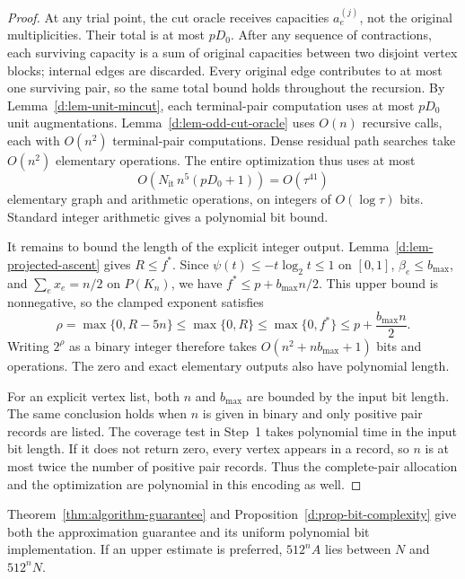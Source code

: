 \begin{proof}
At any trial point, the cut oracle receives capacities \(a_e^{(j)}\),
not the original multiplicities.  Their total is at most \(pD_0\).
After any sequence of contractions, each surviving capacity is a sum
of original capacities between two disjoint vertex blocks; internal
edges are discarded.  Every original edge contributes to at most one
surviving pair, so the same total bound holds throughout the recursion.
By Lemma~\ref{d:lem-unit-mincut}, each terminal-pair computation uses at
most \(pD_0\) unit augmentations.  Lemma~\ref{d:lem-odd-cut-oracle} uses
\(O(n)\) recursive calls, each with \(O(n^2)\) terminal-pair
computations.  Dense residual path searches take \(O(n^2)\) elementary
operations.  The entire optimization thus uses at most
\[
            O\!\left(N_{\mathrm{it}}\,n^5(pD_0+1)\right)
                         =O(\tau^{41})
\]
elementary graph and arithmetic operations, on integers of
\(O(\log\tau)\) bits.  Standard integer arithmetic gives a polynomial
bit bound.

It remains to bound the length of the explicit integer output.
Lemma~\ref{d:lem-projected-ascent} gives \(R\le f^*\).
Since \(\psi(t)\le -t\log_2t\le1\) on \([0,1]\),
\(\beta_e\le b_{\max}\), and \(\sum_e x_e=n/2\) on \(P(K_n)\),
we have \(f^*\le p+b_{\max}n/2\).  This upper bound is nonnegative, so the
clamped exponent satisfies
\begin{equation}
\label{d:eq-clamped-output-size}
 \rho=\max\{0,R-5n\}
       \le\max\{0,R\}
       \le\max\{0,f^*\}
       \le p+\frac{b_{\max}n}{2}.
\end{equation}
Writing \(2^\rho\) as a binary integer therefore takes
\(O(n^2+nb_{\max}+1)\) bits and operations.  The zero and exact elementary
outputs also have polynomial length.

For an explicit vertex list, both \(n\) and \(b_{\max}\) are bounded by the
input bit length.  The same conclusion holds when \(n\) is given in
binary and only positive pair records are listed. The coverage test in
Step~1 takes polynomial time in the input bit length. If it does not
return zero, every vertex appears in a record, so \(n\) is at most twice
the number of positive pair records. Thus the complete-pair allocation
and the optimization are polynomial in this encoding as well.
\end{proof}

Theorem~\ref{thm:algorithm-guarantee} and
Proposition~\ref{d:prop-bit-complexity} give both the approximation
guarantee and its uniform polynomial bit implementation.
If an upper estimate is preferred, \(512^nA\) lies between \(N\)
and \(512^nN\).
